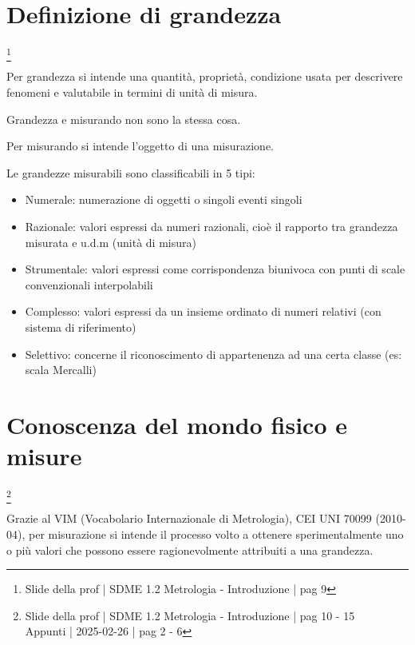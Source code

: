 \newpage 

\section{Definizione di grandezza}
\footnote{Slide della prof | SDME 1.2 Metrologia - Introduzione | pag 9}

Per grandezza si intende una quantità, proprietà, condizione usata per descrivere fenomeni e valutabile in termini di unità di misura. \newline 

Grandezza e misurando non sono la stessa cosa. \newline 

Per misurando si intende l'oggetto di una misurazione. \newline 

Le grandezze misurabili sono classificabili in 5 tipi: 

\begin{itemize}
    \item Numerale: numerazione di oggetti o singoli eventi singoli 
    \item Razionale: valori espressi da numeri razionali, cioè il rapporto tra grandezza misurata e u.d.m (unità di misura) 
    \item Strumentale: valori espressi come corrispondenza biunivoca con punti di scale convenzionali interpolabili 
    \item Complesso: valori espressi da un insieme ordinato di numeri relativi (con sistema di riferimento) 
    \item Selettivo: concerne il riconoscimento di appartenenza ad una certa classe (es: scala Mercalli)
\end{itemize}


\newpage 

\section{Conoscenza del mondo fisico e misure} 
\footnote{Slide della prof | SDME 1.2 Metrologia - Introduzione | pag 10 - 15 \\  
Appunti | 2025-02-26 | pag 2 - 6}

Grazie al VIM (Vocabolario Internazionale di Metrologia), CEI UNI 70099 (2010-04), per misurazione si intende il processo 
volto a ottenere sperimentalmente uno o più valori che possono essere ragionevolmente attribuiti a una grandezza. \newline 

